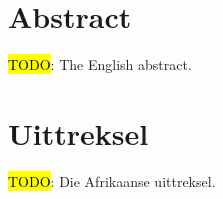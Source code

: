 \chapter*{Abstract}
\makeatletter{}\makeatother

\hl{TODO}: The English abstract.



\chapter*{Uittreksel}
\makeatletter{}\makeatother

\hl{TODO}: Die Afrikaanse uittreksel.

